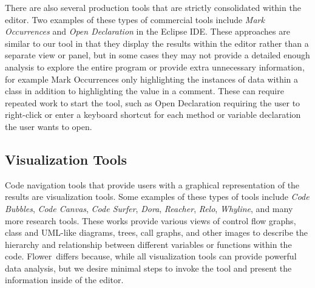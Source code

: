 \documentclass[conference]{IEEEtran}
\newcommand{\toolName}{Flower}
\begin{document}
There are also several production tools that are strictly consolidated within the editor. Two examples of these types of commercial tools include \emph{Mark Occurrences}\cite{MarkOccurrences} and \emph{Open Declaration} in the Eclipse IDE. These approaches are similar to our tool in that they display the results within the editor rather than a separate view or panel, but in some cases they may not provide a detailed enough analysis to explore the entire program or provide extra unnecessary information, for example Mark Occurrences only highlighting the instances of data within a class in addition to highlighting the value in a comment. These can require repeated work to start the tool, such as Open Declaration requiring the user to right-click or enter a keyboard shortcut for each method or variable declaration the user wants to open.

\subsection{Visualization Tools}
Code navigation tools that provide users with a graphical representation of the results are visualization tools. Some examples of these types of tools include \emph{Code Bubbles}\cite{CodeBubbles}, \emph{Code Canvas}\cite{CodeCanvas}, \emph{Code Surfer}\cite{CodeSurfer}, \emph{Dora}\cite{Dora}, \emph{Reacher}\cite{Reacher}, \emph{Relo}\cite{Relo}, \emph{Whyline}\cite{Whyline}, and many more research tools. These works provide various views of control flow graphs, class and UML-like diagrams, trees, call graphs, and other images to describe the hierarchy and relationship between different variables or functions within the code. \toolName~differs because, while all visualization tools can provide powerful data analysis, but we desire minimal steps to invoke the tool and present the information inside of the editor.
\end{document}
